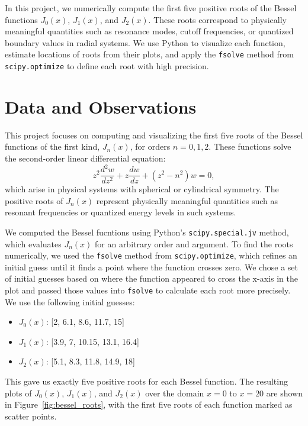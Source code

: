 \documentclass[linenumbers, RNAAS, trackchanges]{aastex631}
\begin{document}
\noindent In this project, we numerically compute the first five positive roots
of the Bessel functions $J_0(x)$, $J_1(x)$, and $J_2(x)$. These roots correspond
to physically meaningful quantities such as resonance modes, cutoff frequencies, 
or quantized boundary values in radial systems. We use Python to visualize each
function, estimate locations of roots from their plots, and apply the \texttt{fsolve}
method from \texttt{scipy.optimize} to define each root with high precision.


\section{Data and Observations} \label{sec:data}

This project focuses on computing and visualizing the first five roots of the
Bessel functions of the first kind, $J_n(x)$, for orders $n=0,1,2$. These
functions solve the second-order linear differential equation:
\begin{equation}
    z^2\frac{d^2 w}{dz^2}+z\frac{dw}{dz}+(z^2-n^2)w=0,
\end{equation}
\noindent which arise in physical systems with spherical or cylindrical 
symmetry. The positive roots of $J_n(x)$ represent physically meaningful
quantities such as resonant frequencies or quantized energy levels in such
systems.

\noindent We computed the Bessel fucntions using Python's \texttt{scipy.special.jv}
method, which evaluates $J_n(x)$ for an arbitrary order and argument. To
find the roots numerically, we used the \texttt{fsolve} method from \texttt{scipy.optimize},
which refines an initial guess until it finds a point where the function crosses
zero. We chose a set of initial guesses based on where the function appeared to
cross the x-axis in the plot and passed those values into \texttt{fsolve} to
calculate each root more precisely. We use the following initial guesses:

\begin{itemize}
    \item $J_0(x)$: [2, 6.1, 8.6, 11.7, 15]
    \item $J_1(x)$: [3.9, 7, 10.15, 13.1, 16.4]
    \item $J_2(x)$: [5.1, 8.3, 11.8, 14.9, 18]
\end{itemize}

\noindent This gave us exactly five positive roots for each Bessel function. The 
resulting plots of $J_0(x)$, $J_1(x)$, and $J_2(x)$ over the domain $x=0$ to
$x=20$ are shown in Figure~\ref{fig:bessel_roots}, with the first five roots of
each function marked as scatter points.
\end{document}
